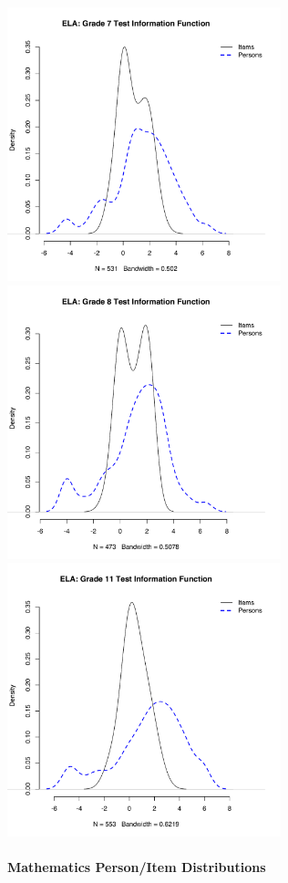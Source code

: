 \documentclass[]{article}
\let\oldparagraph\paragraph
\renewcommand{\paragraph}[1]{\oldparagraph{#1}\mbox{}}
\begin{document}
\includegraphics[width=\textwidth,height=3.125in]{ipdens/ela7ipdens.pdf}
\includegraphics[width=\textwidth,height=3.125in]{ipdens/ela8ipdens.pdf}
\includegraphics[width=\textwidth,height=3.125in]{ipdens/ela11ipdens.pdf}
\clearpage

\hypertarget{mathematics-personitem-distributions}{%
\paragraph{Mathematics Person/Item
Distributions}\label{mathematics-personitem-distributions}}
\end{document}
